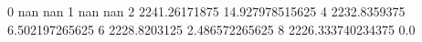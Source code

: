 0 nan nan
1 nan nan
2 2241.26171875 14.927978515625
4 2232.8359375 6.502197265625
6 2228.8203125 2.486572265625
8 2226.333740234375 0.0
